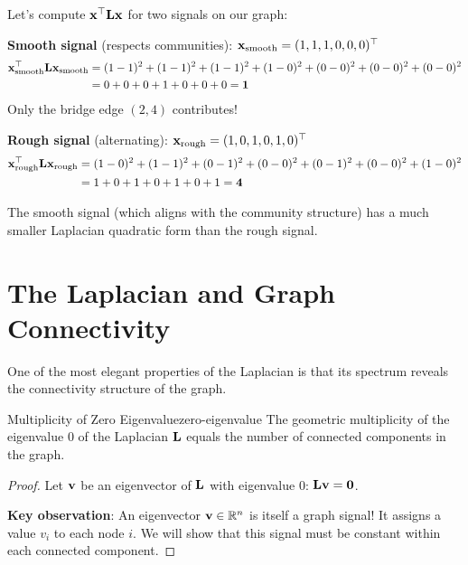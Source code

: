 \begin{notechapter}
\begin{example}
Let's compute $\mathbf{x}^\top \mathbf{L} \mathbf{x}$ for two signals on our graph:

\textbf{Smooth signal} (respects communities): $\mathbf{x}_{\text{smooth}} = (1, 1, 1, 0, 0, 0)^\top$
\begin{align}
\mathbf{x}_{\text{smooth}}^\top \mathbf{L} \mathbf{x}_{\text{smooth}} &= (1-1)^2 + (1-1)^2 + (1-1)^2 + (1-0)^2 + (0-0)^2 + (0-0)^2 + (0-0)^2 \\
&= 0 + 0 + 0 + 1 + 0 + 0 + 0 = \mathbf{1}
\end{align}
Only the bridge edge $(2,4)$ contributes!

\textbf{Rough signal} (alternating): $\mathbf{x}_{\text{rough}} = (1, 0, 1, 0, 1, 0)^\top$
\begin{align}
\mathbf{x}_{\text{rough}}^\top \mathbf{L} \mathbf{x}_{\text{rough}} &= (1-0)^2 + (1-1)^2 + (0-1)^2 + (0-0)^2 + (0-1)^2 + (0-0)^2 + (1-0)^2 \\
&= 1 + 0 + 1 + 0 + 1 + 0 + 1 = \mathbf{4}
\end{align}

The smooth signal (which aligns with the community structure) has a much smaller Laplacian quadratic form than the rough signal.
\end{example}

\section{The Laplacian and Graph Connectivity}

One of the most elegant properties of the Laplacian is that its spectrum reveals the connectivity structure of the graph.

\begin{theorem}{Multiplicity of Zero Eigenvalue}{zero-eigenvalue}
The geometric multiplicity of the eigenvalue $0$ of the Laplacian $\mathbf{L}$ equals the number of connected components in the graph.
\end{theorem}

\begin{proof}
Let $\mathbf{v}$ be an eigenvector of $\mathbf{L}$ with eigenvalue $0$: $\mathbf{L} \mathbf{v} = \mathbf{0}$.

\textbf{Key observation}: An eigenvector $\mathbf{v} \in \mathbb{R}^n$ is itself a graph signal! It assigns a value $v_i$ to each node $i$. We will show that this signal must be constant within each connected component.


\end{proof}
\end{notechapter}
